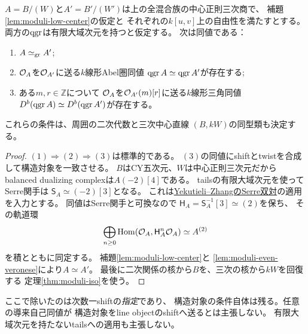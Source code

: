 \begin{theorem}
\label{thm:moduli-marked-derived}
$A=B/(W)$と$A'=B'/(W')$は上の全混合族の中心正則三次商で、
補題\ref{lem:moduli-low-center}の仮定と
それぞれの$k[u,v]$上の自由性を満たすとする。
両方の$\operatorname{qgr}$は有限大域次元を持つと仮定する。
次は同値である：
\begin{enumerate}
\item $A\simeq_{\operatorname{gr}}A'$;
\item $\mathcal O_A$を$\mathcal O_{A'}$に送る$k$線形Abel圏同値
 $\operatorname{qgr} A\simeq\operatorname{qgr} A'$が存在する;
\item ある$m,r\in\mathbb Z$について
 $\mathcal O_A$を$\mathcal O_{A'}(m)[r]$に送る$k$線形三角同値
 $D^b(\operatorname{qgr} A)\simeq D^b(\operatorname{qgr} A')$が存在する。
\end{enumerate}
これらの条件は、周囲の二次代数と三次中心直線
$(B,kW)$の同型類も決定する。
\end{theorem}
\begin{proof}
$(1)\Rightarrow(2)\Rightarrow(3)$は標準的である。
$(3)$の同値にshiftとtwistを合成して構造対象を一致させる。
$B$はCY五次元、$W$は中心正則三次元だから
balanced dualizing complexは$A(-2)[4]$である。
tailsの有限大域次元を使ってSerre関手は
$\mathsf S_A\simeq(-2)[3]$となる。
これは\href{https://www.math.bgu.ac.il/~amyekut/publications/nc-serre/paper.pdf}
{Yekutieli--ZhangのSerre双対}の適用を入力とする。
同値はSerre関手と可換なので
$\mathsf H_A=\mathsf S_A^{-1}[3]\simeq(2)$を保ち、
その軌道環
\[
 \bigoplus_{n\ge0}\operatorname{Hom}(\mathcal O_A,\mathsf H_A^n\mathcal O_A)
 \simeq A^{(2)}
\]
を積とともに同定する。
補題\ref{lem:moduli-low-center}と
\ref{lem:moduli-even-veronese}により$A\simeq A'$。
最後に二次関係の核から$B$を、三次の核から$kW$を回復する
定理\ref{thm:moduli-iso}を使う。
\end{proof}
\begin{remark}
\label{rem:moduli-marking}
ここで除いたのは次数一shiftの\emph{指定}であり、
構造対象の条件自体は残る。任意の導来自己同値が
構造対象をline objectのshiftへ送るとは主張しない。
有限大域次元を持たないtailsへの適用も主張しない。
\end{remark}

